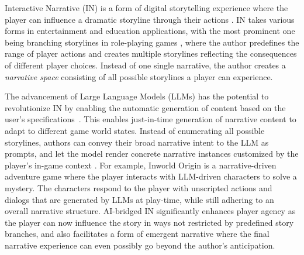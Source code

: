 

Interactive Narrative (IN) is a form of digital storytelling experience where the player can influence a dramatic storyline through their actions \cite{riedl2013interactive,green2014interactive}. 
IN takes various forms in entertainment and education applications, with the most prominent one being branching storylines in role-playing games \cite{riedl2006from}, where the author predefines the range of player actions and creates multiple storylines reflecting the consequences of different player choices. Instead of one single narrative, the author creates a {\em narrative space} consisting of all possible storylines a player can experience. 


The advancement of Large Language Models (LLMs) has the potential to revolutionize IN by enabling the automatic generation of content based on the user's specifications~\cite{li2024pre, li2023synthetic,wei2022chain}. This enables just-in-time generation of narrative content to adapt to different game world states. Instead of enumerating all possible storylines, authors can convey their broad narrative intent to the LLM as prompts, and let the model render concrete narrative instances customized by the player's in-game context \cite{kim2023language,boriskin2024lsg,sweetser2024large,peng2024player}. For example, Inworld Origin \cite{inworldorigin} is a narrative-driven adventure game where the player interacts with LLM-driven characters to solve a mystery. The characters respond to the player with unscripted actions and dialogs that are generated by LLMs at play-time, while still adhering to an overall narrative structure.
AI-bridged IN significantly enhances player agency as the player can now influence the story in ways not restricted by predefined story branches, and also facilitates a form of emergent narrative \cite{aylett1999narrative,suttie2013theoretical} where the final narrative experience can even possibly go beyond the author's anticipation. 


